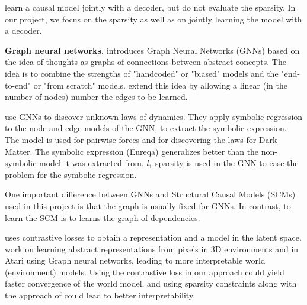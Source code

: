 \documentclass[a4paper,11pt,oneside]{report}
\begin{document}

\cite{Johnson2016,Tang2019,Kurutach2021,Chalupka2015} learn a causal model jointly with a decoder, but do not evaluate the sparsity. In our project, we focus on the sparsity as well as on jointly learning the model with a decoder.

{\bf Graph neural networks.}
 \cite{Battaglia2016} introduces Graph Neural Networks \cite{Zhou2018} (GNNs) based on the idea of thoughts as graphs of connections between abstract concepts. The idea is to combine the strengths of "handcoded" or "biased" models and the "end-to-end" or "from scratch" models. \cite{Velickovic2020} extend this idea by allowing a linear (in the number of nodes) number the edges to be learned.

 \cite{Cranmer2020} use GNNs to discover unknown laws of dynamics. They apply symbolic regression to the node and edge models of the GNN, to extract the symbolic expression. The model is used for pairwise forces and for discovering the laws for Dark Matter. The symbolic expression (Eureqa) generalizes better than the non-symbolic model it was extracted from. $l_1$ sparsity is used in the GNN to ease the problem for the symbolic regression.

One important difference between GNNs and Structural Causal Models (SCMs) used in this project is that the graph is usually fixed for GNNs. In contrast, to learn the SCM is to learns the graph of dependencies.


\cite{VanDenOord2018} uses contrastive losses to obtain a representation and a model in the latent space.
\cite{Kipf2020} work on learning abstract representations from pixels in 3D environments and in Atari using Graph neural networks, leading to more interpretable world (environment) models. Using the contrastive loss in our approach could yield faster convergence of the world model, and using sparsity constraints along with the approach of \cite{Kipf2020} could lead to better interpretability.
\end{document}
